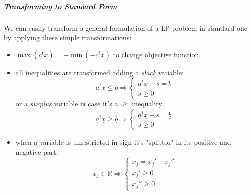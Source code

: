             \subparagraph{Transforming to Standard Form}
                We can easily transform a general formulation of a LP problem in standard one by applying these simple transformations:
                \begin{itemize}
                    \item $\max(\underline{c}^t\underline{x}) = -\min(-\underline{c}^t\underline{x})$ to change objective function
                    \item all inequalities are transformed adding a \emph{slack} variable:
                        \begin{equation}
                            \underline{a}^t\underline{x} \leq \underline{b} \Rightarrow
                                \begin{cases}
                                    \underline{a}^t\underline{x} + s = \underline{b}\\
                                    s \geq 0
                                \end{cases}
                        \end{equation}
                        or a \emph{surplus} variable in case it's a $\geq$ inequality
                        \begin{equation}
                            \underline{a}^t\underline{x} \geq \underline{b} \Rightarrow
                                \begin{cases}
                                    \underline{a}^t\underline{x} - s = \underline{b}\\
                                    s \geq 0
                                \end{cases}
                        \end{equation}
                    \item when a variable is unrestricted in sign it's "splitted" in its positive and negative part:
                        \begin{equation}
                            x_j \in \mathbb{R} \Rightarrow
                                \begin{cases}
                                        x_j = x_j'-x_j''\\
                                        x_j' \geq 0\\
                                        x_j'' \geq 0
                                \end{cases}
                        \end{equation}
                \end{itemize}

